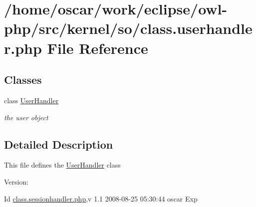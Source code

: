 \hypertarget{class_8userhandler_8php}{
\section{/home/oscar/work/eclipse/owl-php/src/kernel/so/class.userhandler.php File Reference}
\label{class_8userhandler_8php}
}
\subsection*{Classes}
\begin{CompactItemize}
\item 
class \hyperlink{classUserHandler}{UserHandler}
\begin{CompactList}\small\item\em the user object \item\end{CompactList}\end{CompactItemize}


\subsection{Detailed Description}
This file defines the \hyperlink{classUserHandler}{UserHandler} class \begin{Desc}
\item[Version:]\end{Desc}
\begin{Desc}
\item[Id]\hyperlink{class_8sessionhandler_8php}{class.sessionhandler.php},v 1.1 2008-08-25 05:30:44 oscar Exp \end{Desc}
